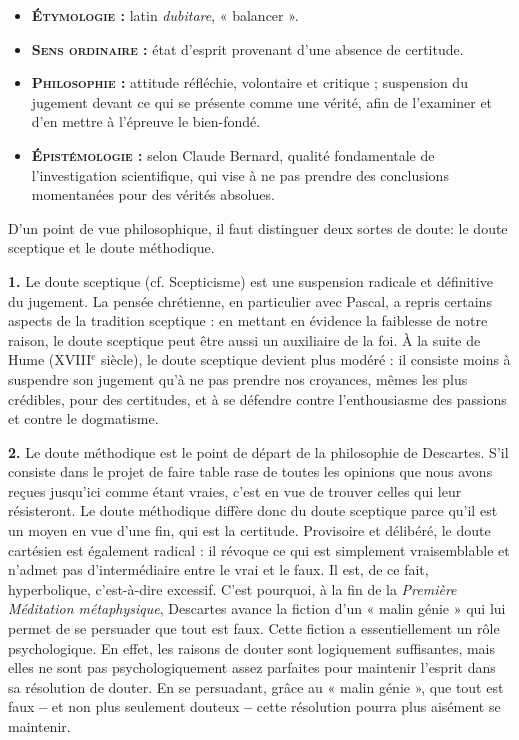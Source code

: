 {\footnotesize
\begin{itemize}[leftmargin=1cm, label=, itemsep=1pt]
\item {\bf \textsc{Étymologie} :} latin {\it dubitare},
« balancer ».
\item {\bf \textsc{Sens ordinaire} :} état
d’esprit provenant d’une absence de certitude.
\item {\bf \textsc{Philosophie} :} attitude
réfléchie, volontaire et critique ; suspension
du jugement devant ce qui
se présente comme une vérité, afin
de l'examiner et d'en mettre à
l'épreuve le bien-fondé.
\item {\bf \textsc{Épistémologie} :} selon Claude Bernard,
qualité fondamentale de l’investigation
scientifique, qui vise à ne pas
prendre des conclusions momentanées
pour des vérités absolues.
\end{itemize}
}

D'un point de vue philosophique, il faut
distinguer deux sortes de doute: le
doute sceptique et le doute méthodique.

{\bf 1.} Le doute sceptique (cf. Scepticisme)
est une suspension radicale et définitive
du jugement. La pensée chrétienne, en
particulier avec Pascal, a repris certains
aspects de la tradition sceptique : en
mettant en évidence la faiblesse de notre
raison, le doute sceptique peut être aussi
un auxiliaire de la foi. À la suite de
Hume ({\footnotesize XVIII}$^\text{e}$ siècle),
le doute sceptique
devient plus modéré : il consiste moins
à suspendre son jugement qu’à ne pas
prendre nos croyances, mêmes les plus
crédibles, pour des certitudes, et à se
défendre contre l'enthousiasme des passions
et contre le dogmatisme.

{\bf 2.} Le doute méthodique est le point de
départ de la philosophie de Descartes.
S'il consiste dans le projet de faire table
rase de toutes les opinions que nous
avons reçues jusqu'ici comme étant
vraies, c'est en vue de trouver celles qui
leur résisteront. Le doute méthodique
diffère donc du doute sceptique parce
qu'il est un moyen en vue d’une fin, qui
est la certitude. Provisoire et délibéré, le
doute cartésien est également radical : il
révoque ce qui est simplement vraisemblable
et n’admet pas d'intermédiaire
entre le vrai et le faux. Il est, de ce fait,
hyperbolique, c'est-à-dire excessif. C’est
pourquoi, à la fin de la {\it Première Méditation
métaphysique}, Descartes avance
la fiction d'un « malin génie » qui lui
permet de se persuader que tout est
faux. Cette fiction a essentiellement un
rôle psychologique. En effet, les raisons
de douter sont logiquement suffisantes,
mais elles ne sont pas psychologiquement
assez parfaites pour maintenir
l'esprit dans sa résolution de douter. En
se persuadant, grâce au « malin génie »,
que tout est faux {\bf --} et non plus seulement
douteux {\bf --} cette résolution pourra
plus aisément se maintenir.

